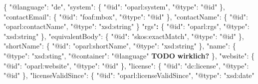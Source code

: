 \documentclass[,a4paper]{article}
\newenvironment{Shaded}{}{}
\newcommand{\DataTypeTok}[1]{\textcolor[rgb]{0.56,0.13,0.00}{{#1}}}
\newcommand{\StringTok}[1]{\textcolor[rgb]{0.25,0.44,0.63}{{#1}}}
\newcommand{\FunctionTok}[1]{\textcolor[rgb]{0.02,0.16,0.49}{{#1}}}
\newcommand{\ErrorTok}[1]{\textcolor[rgb]{1.00,0.00,0.00}{\textbf{{#1}}}}
\begin{document}
\begin{Shaded}
\begin{Highlighting}[]
\FunctionTok{\{}
    \DataTypeTok{"@language"}\FunctionTok{:} \StringTok{"de"}\FunctionTok{,}
    \DataTypeTok{"system"}\FunctionTok{:} \FunctionTok{\{}
        \DataTypeTok{"@id"}\FunctionTok{:} \StringTok{"oparl:system"}\FunctionTok{,}
        \DataTypeTok{"@type"}\FunctionTok{:} \StringTok{"@id"}
    \FunctionTok{\},}
    \DataTypeTok{"contactEmail"}\FunctionTok{:} \FunctionTok{\{}
        \DataTypeTok{"@id"}\FunctionTok{:} \StringTok{"foaf:mbox"}\FunctionTok{,}
        \DataTypeTok{"@type"}\FunctionTok{:} \StringTok{"@id"}
    \FunctionTok{\},}
    \DataTypeTok{"contactName"}\FunctionTok{:} \FunctionTok{\{}
        \DataTypeTok{"@id"}\FunctionTok{:} \StringTok{"oparl:contactName"}\FunctionTok{,}
        \DataTypeTok{"@type"}\FunctionTok{:} \StringTok{"xsd:string"}
    \FunctionTok{\}}
    \StringTok{"rgs"}\ErrorTok{:} \FunctionTok{\{} 
        \DataTypeTok{"@id"}\FunctionTok{:} \StringTok{"oparl:rgs"}\FunctionTok{,}
        \DataTypeTok{"@type"}\FunctionTok{:} \StringTok{"xsd:string"}
    \FunctionTok{\},}
    \DataTypeTok{"equivalentBody"}\FunctionTok{:} \FunctionTok{\{}
        \DataTypeTok{"@id"}\FunctionTok{:} \StringTok{"skos:exactMatch"}\FunctionTok{,}
        \DataTypeTok{"@type"}\FunctionTok{:} \StringTok{"@id"} 
    \FunctionTok{\},}
    \DataTypeTok{"shortName"}\FunctionTok{:} \FunctionTok{\{}
        \DataTypeTok{"@id"}\FunctionTok{:} \StringTok{"oparl:shortName"}\FunctionTok{,}
        \DataTypeTok{"@type"}\FunctionTok{:} \StringTok{"xsd:string"}
    \FunctionTok{\},}
    \DataTypeTok{"name"}\FunctionTok{:} \FunctionTok{\{}
        \DataTypeTok{"@type"}\FunctionTok{:} \StringTok{"xsd:sting"}\FunctionTok{,}
        \DataTypeTok{"@container"}\FunctionTok{:} \StringTok{"@language"} \ErrorTok{TODO} \ErrorTok{wirklich?}
    \FunctionTok{\},}
    \DataTypeTok{"website"}\FunctionTok{:} \FunctionTok{\{}
        \DataTypeTok{"@id"}\FunctionTok{:} \StringTok{"oparl:website"}\FunctionTok{,}
        \DataTypeTok{"@type"}\FunctionTok{:} \StringTok{"@id"}
    \FunctionTok{\},}
    \DataTypeTok{"license"}\FunctionTok{:} \FunctionTok{\{}
        \DataTypeTok{"@id"}\FunctionTok{:} \StringTok{"dc:license"}\FunctionTok{,}
        \DataTypeTok{"@type"}\FunctionTok{:} \StringTok{"@id"}
    \FunctionTok{\},}
    \DataTypeTok{"licenseValidSince"}\FunctionTok{:} \FunctionTok{\{}
        \DataTypeTok{"@id"}\FunctionTok{:} \StringTok{"oparl:licenseValidSince"}\FunctionTok{,}
        \DataTypeTok{"@type"}\FunctionTok{:} \StringTok{"xsd:date"}

\end{Highlighting}
\end{Shaded}
\end{document}
